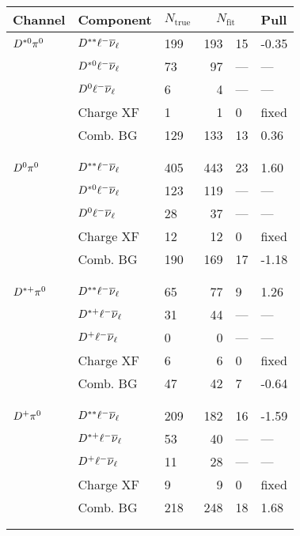 \documentclass[landscape]{article}
\begin{document}
\begin{tabular}{l l l r @{ $\pm$ } l l}\hline\hline
Channel & Component & $N_\mathrm{true}$ & \multicolumn{2}{c}{$N_\mathrm{fit}$} & Pull\\ \hline
$D^{*0}\pi^0$ & $D^{**}\ell^-\overline{\nu}_\ell$ & 199 & 193 & 15 & -0.35\\
 & $D^{*0}\ell^-\overline{\nu}_\ell$ & 73 & 97 & --- & ---\\
 & $D^0\ell^-\overline{\nu}_\ell$ & 6 & 4 & --- & ---\\
 & Charge XF & 1 & 1 & 0 & fixed\\
 & Comb. BG & 129 & 133 & 13 & 0.36\\  \\ \\ \hline
$D^0\pi^0$ & $D^{**}\ell^-\overline{\nu}_\ell$ & 405 & 443 & 23 & 1.60\\
 & $D^{*0}\ell^-\overline{\nu}_\ell$ & 123 & 119 & --- & ---\\
 & $D^0\ell^-\overline{\nu}_\ell$ & 28 & 37 & --- & ---\\
 & Charge XF & 12 & 12 & 0 & fixed\\
 & Comb. BG & 190 & 169 & 17 & -1.18\\  \\ \\ \hline
$D^{*+}\pi^0$ & $D^{**}\ell^-\overline{\nu}_\ell$ & 65 & 77 & 9 & 1.26\\
 & $D^{*+}\ell^-\overline{\nu}_\ell$ & 31 & 44 & --- & ---\\
 & $D^+\ell^-\overline{\nu}_\ell$ & 0 & 0 & --- & ---\\
 & Charge XF & 6 & 6 & 0 & fixed\\
 & Comb. BG & 47 & 42 & 7 & -0.64\\  \\ \\ \hline
$D^+\pi^0$ & $D^{**}\ell^-\overline{\nu}_\ell$ & 209 & 182 & 16 & -1.59\\
 & $D^{*+}\ell^-\overline{\nu}_\ell$ & 53 & 40 & --- & ---\\
 & $D^+\ell^-\overline{\nu}_\ell$ & 11 & 28 & --- & ---\\
 & Charge XF & 9 & 9 & 0 & fixed\\
 & Comb. BG & 218 & 248 & 18 & 1.68\\  \\ \\ \hline
\hline
\end{tabular}
\end{document}
